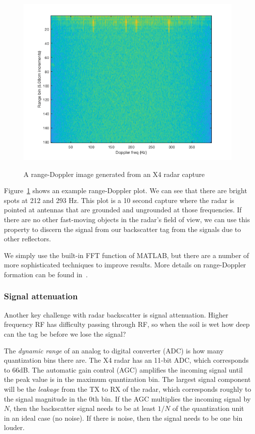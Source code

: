 \documentclass[12pt]{article}
\begin{document}
\begin{figure}[h!]
  \centering
  \includegraphics[scale=0.5]{rangedoppler.png}\\
  \caption{A range-Doppler image generated from an X4 radar capture}
  \label{figure:rdplot}
\end{figure}

Figure~\ref{figure:rdplot} shows an example range-Doppler plot. We can
see that there are bright spots at 212 and 293 Hz. This plot is a 10
second capture where the radar is pointed at antennas that are
grounded and ungrounded at those frequencies. If there are no other
fast-moving objects in the radar's field of view, we can use this
property to discern the signal from our backscatter tag from the
signals due to other reflectors.

We simply use the built-in FFT function of MATLAB, but there are a
number of more sophisticated techniques to improve results. More
details on range-Doppler formation can be found
in~\cite{rangeDoppler}.

\subsubsection*{Signal attenuation}

Another key challenge with radar backscatter is signal
attenuation. Higher frequency RF has difficulty passing through RF, so
when the soil is wet how deep can the tag be before we lose the
signal?

The \emph{dynamic range} of an analog to digital converter (ADC) is
how many quantization bins there are. The X4 radar has an 11-bit ADC,
which corresponds to 66dB. The automatic gain control (AGC) amplifies
the incoming signal until the peak value is in the maximum
quantization bin. The largest signal component will be the
\emph{leakage} from the TX to RX of the radar, which corresponds
roughly to the signal magnitude in the 0th bin. If the AGC multiplies
the incoming signal by $N$, then the backscatter signal needs to be at
least $1/N$ of the quantization unit in an ideal case (no noise). If
there is noise, then the signal needs to be one bin louder.
\end{document}
